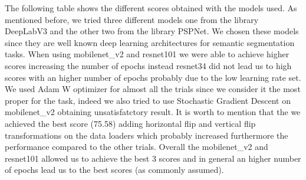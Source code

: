 \documentclass{article}
\begin{document}
The following table shows the different scores obtained with the models used. As mentioned before, we tried three different models one from the library DeepLabV3 and the other two from the library PSPNet. We chosen these models since they are well known deep learning architectures for semantic segmentation tasks. 
When using mobilenet\_v2 and resnet101 we were able to achieve higher scores increasing the number of epochs instead resnet34 did not lead us to high scores with an higher number of epochs probably due to the low learning rate set.
We used Adam W optimizer for almost all the trials since we consider it the most proper for the task, indeed we also tried to use Stochastic Gradient Descent on mobilenet\_v2 obtaining unsatisfatctory result.
It is worth to mention that the we achieved the best score (75.58) adding horizontal flip and vertical flip transformations on the data loaders which probably increased furthermore the performance compared to the other trials. 
Overall the mobilenet\_v2 and resnet101 allowed us to achieve the best 3 scores and in general an higher number of epochs lead us to the best scores (as commonly assumed).
\end{document}
